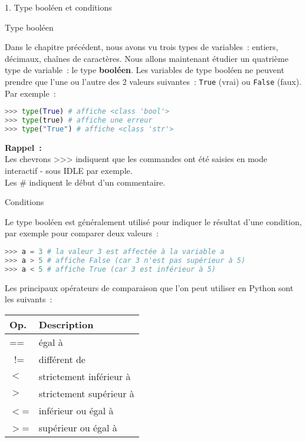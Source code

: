
\begin{h2}1. Type booléen et conditions\end{h2}
\begin{h3} Type booléen\end{h3}
Dans le chapitre précédent, nous avons vu trois types de variables~: entiers, décimaux, chaînes de caractères. Nous allons maintenant étudier un quatrième type de variable~: le type \textbf{booléen}.
\newpar
Les variables de type booléen ne peuvent prendre que l'une ou l'autre des 2 valeurs suivantes~: \texttt{True} (vrai) ou \texttt{False} (faux).
Par exemple~:
\begin{lstlisting}[language=Python]
>>> type(True) # affiche <class 'bool'>
>>> type(true) # affiche une erreur
>>> type("True") # affiche <class 'str'>
\end{lstlisting}
\textbf{Rappel~:}\\
Les chevrons >>> indiquent que les commandes ont été saisies en mode interactif - sous IDLE par exemple.\\
Les \# indiquent le début d'un commentaire.
\begin{h3}Conditions\end{h3}
Le type booléen est généralement utilisé pour indiquer le résultat d'une condition, par exemple pour comparer deux valeurs~:
\begin{lstlisting}[language=Python]
>>> a = 3 # la valeur 3 est affectée à la variable a
>>> a > 5 # affiche False (car 3 n'est pas supérieur à 5)
>>> a < 5 # affiche True (car 3 est inférieur à 5)
\end{lstlisting}
Les principaux opérateurs de comparaison que l'on peut utiliser en Python sont les suivants~:
\begin{center}
     \begin{tabularx}{0.9\linewidth}{|*{2}{>{\centering \arraybackslash }X|}}%
          \hline
          \textbf{Op.} & \textbf{Description}
          \\ \hline
          == & égal à
          \\ \hline~!= & différent de
          \\ \hline
          $<$ & strictement inférieur à
          \\ \hline
          $>$ & strictement supérieur à
          \\ \hline
          $<$= & inférieur ou égal à
          \\ \hline
          $>$= & supérieur ou égal à
          \\ \hline
     \end{tabularx}
\end{center}
